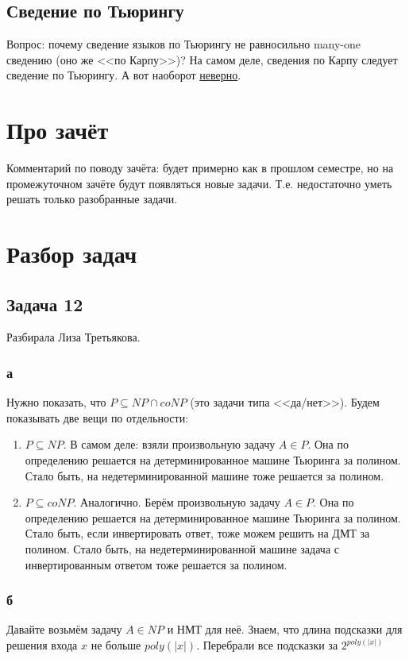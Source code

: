 \subsection{Сведение по Тьюрингу}
	Вопрос: почему сведение языков по Тьюрингу не равносильно many-one сведению (оно же <<по Карпу>>)?
	На самом деле, сведения по Карпу следует сведение по Тьюрингу.
	А вот наоборот \hyperref[task_14_rem_turing]{неверно}.

\section{Про зачёт}
	Комментарий по поводу зачёта: будет примерно как в прошлом семестре, но на промежуточном
	зачёте будут появляться новые задачи.
	Т.е. недостаточно уметь решать только разобранные задачи.

\section{Разбор задач}
\subsection{Задача 12}
	Разбирала Лиза Третьякова.

	\subsubsection{а}
		Нужно показать, что $P \subseteq NP \cap coNP$ (это задачи типа <<да/нет>>).
		Будем показывать две вещи по отдельности:
		\begin{enumerate}
			\item
				$P \subseteq NP$.
				В самом деле: взяли произвольную задачу $A \in P$.
				Она по определению решается на детерминированное машине Тьюринга за полином.
				Стало быть, на недетерминированной машине тоже решается за полином.
			\item
				$P \subseteq coNP$.
				Аналогично.
				Берём произвольную задачу $A \in P$.
				Она по определению решается на детерминированное машине Тьюринга за полином.
				Стало быть, если инвертировать ответ, тоже можем решить на ДМТ за полином.
				Стало быть, на недетерминированной машине задача с инвертированным ответом тоже решается за полином.
		\end{enumerate}

	\subsubsection{б}
		Давайте возьмём задачу $A \in NP$ и НМТ для неё.
		Знаем, что длина подсказки для решения входа $x$ не больше $poly(|x|)$.
		Перебрали все подсказки за $2^{poly(|x|)}$

